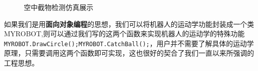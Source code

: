 \begin{figure}[htbp]
    \centering
    \caption{空中截物检测仿真展示}
    \label{fig:17}
\end{figure}

如果我们是用\textbf{面向对象编程}的思想，我们可以将机器人的运动学功能封装成一个类MYROBOT,则可以通过我们写的这两个函数来实现机器人的运动学的特殊功能\verb|MYROBOT.DrawCircle();MYROBOT.CatchBall();|，用户并不需要了解具体的运动学原理，只需要调用这两个函数即可实现，这也很好的契合了我们一直以来所强调的工程思想。